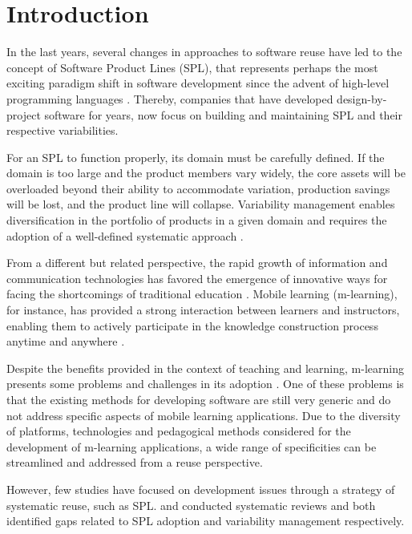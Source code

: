 \section{Introduction}

In the last years, several changes in approaches to software reuse have led to the concept of Software Product Lines (SPL), that represents perhaps the most exciting paradigm shift in software development since the advent of high-level programming languages \cite{vanderlinden07}. Thereby, companies that have developed design-by-project software for years, now focus on building and maintaining SPL and their respective variabilities. 

For an SPL to function properly, its domain must be carefully defined. If the domain is too large and the product members vary widely, the core assets will be overloaded beyond their ability to accommodate variation, production savings will be lost, and the product line will collapse. Variability management enables diversification in the portfolio of products in a given domain and requires the adoption of a well-defined systematic approach \cite{bockle05,vanderlinden07}.

From a different but related perspective, the rapid growth of information and communication technologies has favored the emergence of innovative ways for facing the shortcomings of traditional education \cite{west12}. Mobile learning (m-learning), for instance, has provided a strong interaction between learners and instructors, enabling them to actively participate in the knowledge construction process anytime and anywhere \cite{moreira2018special,kukulska05}. 

Despite the benefits provided in the context of teaching and learning, m-learning presents some problems and challenges in its adoption \cite{sharples13}. One of these problems is that the existing methods for developing software are still very generic and do not address specific aspects of mobile learning applications. Due to the diversity of platforms, technologies and pedagogical methods considered for the development of m-learning applications, a wide range of specificities can be streamlined and addressed from a reuse perspective. 

However, few studies have focused on development issues through a strategy of systematic reuse, such as SPL. \cite{bezerra09} and \cite{chen11} conducted systematic reviews and both identified gaps related to SPL adoption and variability management respectively.

